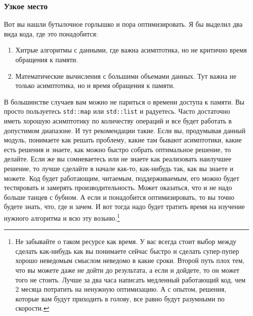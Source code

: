 \documentclass{article}
\begin{document}
\subsubsection{Узкое место}

Вот вы нашли бутылочное горлышко и пора оптимизировать. Я бы выделил два вида кода, где это понадобится:
\begin{enumerate}
\item Хитрые алгоритмы с данными, где важна асимптотика, но не критично время обращения к памяти.
\item Математические вычисления с большими объемами данных. Тут важна не только асимптотика, но и время обращения к памяти.
\end{enumerate}
В большинстве случаев вам можно не париться о времени доступа к памяти. Вы просто пользуетесь \verb"std::map" или \verb"std::list" и радуетесь. Часто достаточно иметь хорошую асимптотику по количеству операций и все будет работать в допустимом диапазоне. И тут рекомендации такие. Если вы, продумывая данный модуль, понимаете как решать проблему, какие там бывают асимптотики, какие есть решения и знаете, как можно быстро собрать оптимальное решение, то делайте. Если же вы сомневаетесь или не знаете как реализовать наилучшее решение, то лучше сделайте в начале как-то, как-нибудь так, как вы знаете и можете. Код будет работающим, читаемым, поддерживаемым, его можно будет тестировать и замерять производительность. Может оказаться, что и не надо больше танцев с бубном. А если и понадобится оптимизировать, то вы точно будете знать, что, где и зачем. И вот тогда надо будет тратить время на изучение нужного алгоритма и всю эту возьню.\footnote{Не забывайте о таком ресурсе как время. У вас всегда стоит выбор между сделать как-нибудь как вы понимаете сейчас быстро и сделать супер-пупер хорошо неведомым смыслом неведомо в какие сроки. Второй путь плох тем, что вы можете даже не дойти до результата, а если и дойдете, то он может того не стоить. Лучше за два часа написать медленный работающий код, чем 2 месяца потратить на ненужную оптимизацию. А с опытом, решения, которые вам будут приходить в голову, все равно будут разумными по скорости.}
\end{document}
